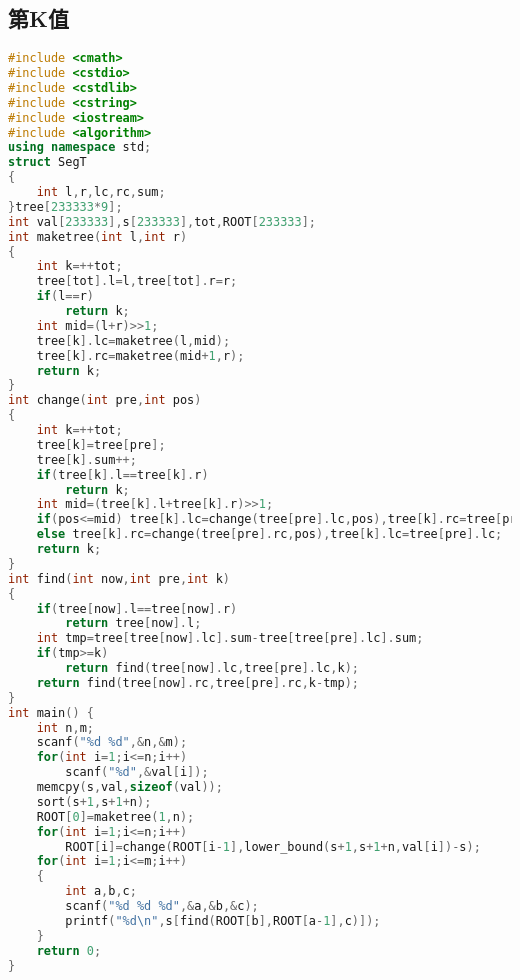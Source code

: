 \subsection{第K值}
    \begin{lstlisting}[language=c++]
#include <cmath>
#include <cstdio>
#include <cstdlib>
#include <cstring>
#include <iostream>
#include <algorithm>
using namespace std;
struct SegT
{
    int l,r,lc,rc,sum;
}tree[233333*9];
int val[233333],s[233333],tot,ROOT[233333];
int maketree(int l,int r)
{
    int k=++tot;
    tree[tot].l=l,tree[tot].r=r;
    if(l==r)
        return k;
    int mid=(l+r)>>1;    
    tree[k].lc=maketree(l,mid);
    tree[k].rc=maketree(mid+1,r);
    return k;
}
int change(int pre,int pos)
{
    int k=++tot;
    tree[k]=tree[pre];
    tree[k].sum++;
    if(tree[k].l==tree[k].r)
        return k;
    int mid=(tree[k].l+tree[k].r)>>1;
    if(pos<=mid) tree[k].lc=change(tree[pre].lc,pos),tree[k].rc=tree[pre].rc;
    else tree[k].rc=change(tree[pre].rc,pos),tree[k].lc=tree[pre].lc;
    return k;
}
int find(int now,int pre,int k)
{
    if(tree[now].l==tree[now].r)
        return tree[now].l;
    int tmp=tree[tree[now].lc].sum-tree[tree[pre].lc].sum;
    if(tmp>=k)
        return find(tree[now].lc,tree[pre].lc,k);
    return find(tree[now].rc,tree[pre].rc,k-tmp);
}
int main() {
    int n,m;
    scanf("%d %d",&n,&m);
    for(int i=1;i<=n;i++)
        scanf("%d",&val[i]);
    memcpy(s,val,sizeof(val));
    sort(s+1,s+1+n);
    ROOT[0]=maketree(1,n);
    for(int i=1;i<=n;i++)
        ROOT[i]=change(ROOT[i-1],lower_bound(s+1,s+1+n,val[i])-s);
    for(int i=1;i<=m;i++)
    {
        int a,b,c;
        scanf("%d %d %d",&a,&b,&c);
        printf("%d\n",s[find(ROOT[b],ROOT[a-1],c)]);
    }
    return 0;
}
    \end{lstlisting}
